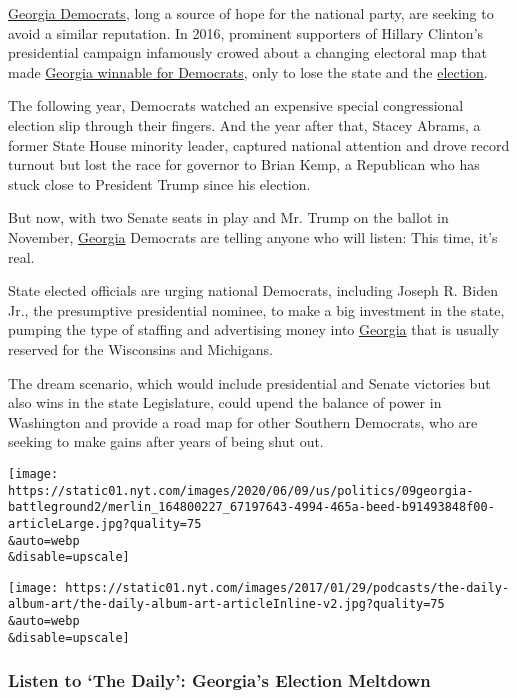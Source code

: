 \href{https://www.nytimes.com/2020/06/10/us/politics/georgia-primary-election-voting.html}{Georgia
Democrats}, long a source of hope for the national party, are seeking to
avoid a similar reputation. In 2016, prominent supporters of Hillary
Clinton's presidential campaign infamously crowed about a changing
electoral map that made
\href{https://www.nytimes.com/2020/06/11/podcasts/the-daily/georgia-general-election.html}{Georgia
winnable for Democrats}, only to lose the state and the
\href{https://www.nytimes.com/2020/06/09/us/politics/atlanta-voting-georgia-primary.html}{election}.

The following year, Democrats watched an expensive special congressional
election slip through their fingers. And the year after that, Stacey
Abrams, a former State House minority leader, captured national
attention and drove record turnout but lost the race for governor to
Brian Kemp, a Republican who has stuck close to President Trump since
his election.

But now, with two Senate seats in play and Mr. Trump on the ballot in
November,
\href{https://www.nytimes.com/2020/06/09/us/politics/atlanta-voting-georgia-primary.html}{Georgia}
Democrats are telling anyone who will listen: This time, it's real.

State elected officials are urging national Democrats, including Joseph
R. Biden Jr., the presumptive presidential nominee, to make a big
investment in the state, pumping the type of staffing and advertising
money into
\href{https://www.nytimes.com/2020/06/09/us/politics/georgia-primary-voting-atlanta.html}{Georgia}
that is usually reserved for the Wisconsins and Michigans.

The dream scenario, which would include presidential and Senate
victories but also wins in the state Legislature, could upend the
balance of power in Washington and provide a road map for other Southern
Democrats, who are seeking to make gains after years of being shut out.

\texttt{[image: https://static01.nyt.com/images/2020/06/09/us/politics/09georgia-battleground2/merlin\_164800227\_67197643-4994-465a-beed-b91493848f00-articleLarge.jpg?quality=75\\\&auto=webp\\\&disable=upscale]}

\texttt{[image: https://static01.nyt.com/images/2017/01/29/podcasts/the-daily-album-art/the-daily-album-art-articleInline-v2.jpg?quality=75\\\&auto=webp\\\&disable=upscale]}

\hypertarget{listen-to-the-daily-georgias-election-meltdown}{%
\subsubsection{Listen to `The Daily': Georgia's Election
Meltdown}\label{listen-to-the-daily-georgias-election-meltdown}}

